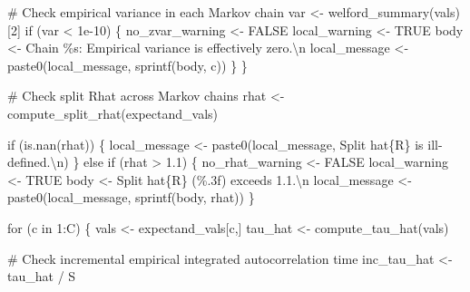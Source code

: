 \documentclass[
  letterpaper,
  DIV=11,
  numbers=noendperiod]{scrartcl}
\newenvironment{Shaded}{\begin{snugshade}}{\end{snugshade}}
\newcommand{\CharTok}[1]{\textcolor[rgb]{0.13,0.47,0.30}{#1}}
\newcommand{\CommentTok}[1]{\textcolor[rgb]{0.37,0.37,0.37}{#1}}
\newcommand{\ControlFlowTok}[1]{\textcolor[rgb]{0.00,0.23,0.31}{#1}}
\newcommand{\DecValTok}[1]{\textcolor[rgb]{0.68,0.00,0.00}{#1}}
\newcommand{\FloatTok}[1]{\textcolor[rgb]{0.68,0.00,0.00}{#1}}
\newcommand{\KeywordTok}[1]{\textcolor[rgb]{0.00,0.23,0.31}{#1}}
\newcommand{\NormalTok}[1]{\textcolor[rgb]{0.00,0.23,0.31}{#1}}
\newcommand{\OperatorTok}[1]{\textcolor[rgb]{0.37,0.37,0.37}{#1}}
\newcommand{\SpecialCharTok}[1]{\textcolor[rgb]{0.37,0.37,0.37}{#1}}
\newcommand{\StringTok}[1]{\textcolor[rgb]{0.13,0.47,0.30}{#1}}
\begin{document}
\begin{Shaded}
\begin{Highlighting}[]
      \CommentTok{\# Check empirical variance in each Markov chain}
\NormalTok{      var }\OperatorTok{\textless{}{-}}\NormalTok{ welford\_summary(vals)[}\DecValTok{2}\NormalTok{]}
      \ControlFlowTok{if}\NormalTok{ (var }\OperatorTok{\textless{}} \FloatTok{1e{-}10}\NormalTok{) \{}
\NormalTok{        no\_zvar\_warning }\OperatorTok{\textless{}{-}}\NormalTok{ FALSE}
\NormalTok{        local\_warning }\OperatorTok{\textless{}{-}}\NormalTok{ TRUE}
\NormalTok{        body }\OperatorTok{\textless{}{-}} \StringTok{\textquotesingle{}  Chain }\SpecialCharTok{\%s}\StringTok{: Empirical variance is effectively zero.}\CharTok{\textbackslash{}n}\StringTok{\textquotesingle{}}
\NormalTok{        local\_message }\OperatorTok{\textless{}{-}}\NormalTok{ paste0(local\_message, sprintf(body, c))}
\NormalTok{      \}}
\NormalTok{    \}}
  
    \CommentTok{\# Check split Rhat across Markov chains}
\NormalTok{    rhat }\OperatorTok{\textless{}{-}}\NormalTok{ compute\_split\_rhat(expectand\_vals)}

    \ControlFlowTok{if}\NormalTok{ (}\KeywordTok{is}\NormalTok{.nan(rhat)) \{}
\NormalTok{      local\_message }\OperatorTok{\textless{}{-}}\NormalTok{ paste0(local\_message,}
                              \StringTok{\textquotesingle{}  Split hat}\SpecialCharTok{\{R\}}\StringTok{ is ill{-}defined.}\CharTok{\textbackslash{}n}\StringTok{\textquotesingle{}}\NormalTok{)}
\NormalTok{    \} }\ControlFlowTok{else} \ControlFlowTok{if}\NormalTok{ (rhat }\OperatorTok{\textgreater{}} \FloatTok{1.1}\NormalTok{) \{}
\NormalTok{      no\_rhat\_warning }\OperatorTok{\textless{}{-}}\NormalTok{ FALSE}
\NormalTok{      local\_warning }\OperatorTok{\textless{}{-}}\NormalTok{ TRUE}
\NormalTok{      body }\OperatorTok{\textless{}{-}} \StringTok{\textquotesingle{}  Split hat}\SpecialCharTok{\{R\}}\StringTok{ (}\SpecialCharTok{\%.3f}\StringTok{) exceeds 1.1.}\CharTok{\textbackslash{}n}\StringTok{\textquotesingle{}}
\NormalTok{      local\_message }\OperatorTok{\textless{}{-}}\NormalTok{ paste0(local\_message, sprintf(body, rhat))}
\NormalTok{    \}}

    \ControlFlowTok{for}\NormalTok{ (c }\KeywordTok{in} \DecValTok{1}\NormalTok{:C) \{}
\NormalTok{      vals }\OperatorTok{\textless{}{-}}\NormalTok{ expectand\_vals[c,]}
\NormalTok{      tau\_hat }\OperatorTok{\textless{}{-}}\NormalTok{ compute\_tau\_hat(vals)}

      \CommentTok{\# Check incremental empirical integrated autocorrelation time}
\NormalTok{      inc\_tau\_hat }\OperatorTok{\textless{}{-}}\NormalTok{ tau\_hat }\OperatorTok{/}\NormalTok{ S}


\end{Highlighting}
\end{Shaded}
\end{document}
